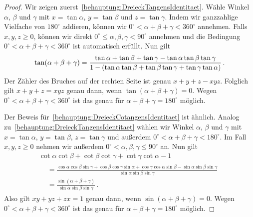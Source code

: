 \begin{proof}
	Wir zeigen zuerst~\ref{behauptung:DreieckTangensIdentitaet}. Wähle Winkel $\alpha$, $\beta$ und $\gamma$ mit $x=\tan\alpha$, $y=\tan\beta$ und $z=\tan\gamma$. Indem wir ganzzahlige Vielfache von $180^\circ$ addieren, können wir $0^\circ<\alpha+\beta+\gamma< 360^\circ$ annehmen. Falls $x,y,z\geqslant 0$,  können wir direkt $0^\circ\leqslant \alpha,\beta,\gamma<90^\circ$ annehmen und die Bedingung $0^\circ<\alpha+\beta+\gamma< 360^\circ$ ist automatisch erfüllt. Nun gilt
	\begin{equation*}
		\tan(\alpha+\beta+\gamma)=\frac{\tan\alpha+\tan\beta+\tan\gamma-\tan\alpha\tan\beta\tan\gamma}{1-\parens*{\tan\alpha\tan\beta+\tan\beta\tan\gamma+\tan\gamma\tan\alpha}}\,.
	\end{equation*}
	Der Zähler des Bruches auf der rechten Seite ist genau $x+y+z-xyz$. Folglich gilt $x+y+z=xyz$ genau dann, wenn $\tan(\alpha+\beta+\gamma)=0$. Wegen $0^\circ<\alpha+\beta+\gamma< 360^\circ$ ist das genau für $\alpha+\beta+\gamma=180^\circ$ möglich.
	
	Der Beweis für~\ref{behauptung:DreieckCotangensIdentitaet} ist ähnlich. Analog zu~\ref{behauptung:DreieckTangensIdentitaet} wählen wir Winkel $\alpha$, $\beta$ und $\gamma$ mit $x=\tan\alpha$, $y=\tan\beta$, $z=\tan\gamma$ und außerdem $0^\circ<\alpha+\beta+\gamma< 180^\circ$. Im Fall $x,y,z\geqslant 0$ nehmen wir außerdem $0^\circ <\alpha,\beta,\gamma\leqslant 90^\circ$ an. Nun gilt
	\begin{multline*}
		\cot\alpha\cot\beta+\cot\beta\cot\gamma+\cot\gamma\cot\alpha-1\\
		\begin{aligned}
			&=\frac{\cos\alpha\cos\beta\sin\gamma+\cos\beta\cos\gamma\sin\alpha+\cos\gamma\cos\alpha\sin\beta-\sin\alpha\sin\beta\sin\gamma}{\sin\alpha\sin\beta\sin\gamma}\\
			&=\frac{\sin(\alpha+\beta+\gamma)}{\sin\alpha\sin\beta\sin\gamma}\,.
		\end{aligned}
	\end{multline*}
	Also gilt $xy+yz+zx=1$ genau dann, wenn $\sin(\alpha+\beta+\gamma)=0$. Wegen $0^\circ<\alpha+\beta+\gamma< 360^\circ$ ist das genau für $\alpha+\beta+\gamma=180^\circ$ möglich.
	

\end{proof}
